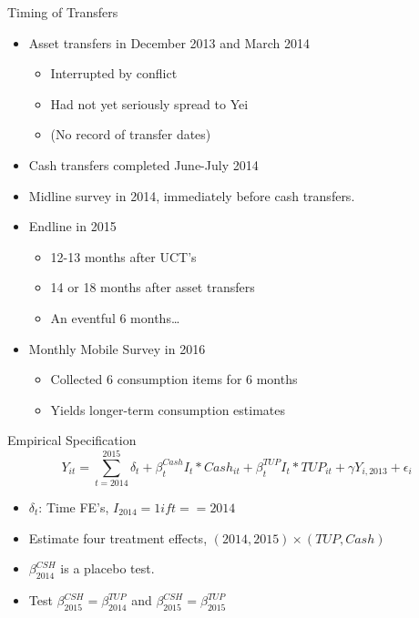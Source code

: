 \documentclass[t,presentation]{beamer}
\begin{document}
\begin{frame}[label={sec:orgheadline10}]{Timing of Transfers}
\begin{itemize}
\item Asset transfers in December 2013 and March 2014

\begin{itemize}
\item Interrupted by conflict
\item Had not yet seriously spread to Yei
\item (No record of transfer dates)
\end{itemize}

\item Cash transfers completed June-July 2014

\item Midline survey in 2014, immediately before cash transfers.

\item Endline in 2015

\begin{itemize}
\item 12-13 months after UCT's
\item 14 or 18 months after asset transfers
\item An eventful 6 months\ldots{}
\end{itemize}

\item Monthly Mobile Survey in 2016

\begin{itemize}
\item Collected 6 consumption items for 6 months
\item Yields longer-term consumption estimates
\end{itemize}
\end{itemize}
\end{frame}

\begin{frame}[label={sec:orgheadline11}]{Empirical Specification}
\begin{equation*}
Y_{it} =\sum_{t=2014}^{2015}\delta_{t}+\beta_{t}^{Cash}I_{t}*Cash_{it}+\beta_{t}^{TUP}I_{t}*TUP_{it}+\gamma Y_{i,2013}+\epsilon_{i}
\end{equation*}

\begin{itemize}
\item \(\delta_{t}\): Time FE's,  \(I_{2014}= 1 if t==2014\)
\item Estimate four treatment effects, \((2014,2015)\times(TUP,Cash)\)
\item \(\beta^{CSH}_{2014}\) is a placebo test.
\item Test \(\beta^{CSH}_{2015} = \beta^{TUP}_{2014}\) and \(\beta^{CSH}_{2015} = \beta^{TUP}_{2015}\)
\end{itemize}
\end{frame}
\end{document}
